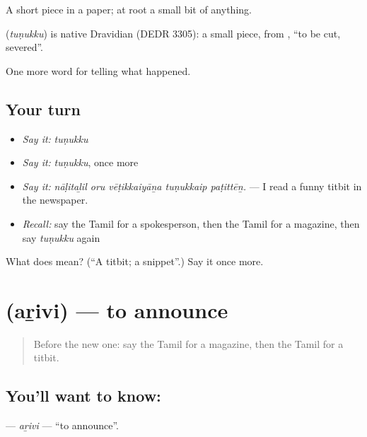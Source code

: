 A short piece in a paper; at root a small bit of anything.

\begin{cousinweb}
\textbf{} (\emph{tuṇukku}) is native Dravidian (DEDR 3305): a small piece, from , \textquotedblleft{}to be cut, severed\textquotedblright{}.
\end{cousinweb}

\begin{grammarlens}[title={What you've built}]
One more word for telling what happened.
\end{grammarlens}

\subsection*{Your turn}
\begin{itemize}
\raggedright
  \item \emph{Say it:} \emph{tuṇukku}
  \item \emph{Say it:} \emph{tuṇukku}, once more
  \item \emph{Say it:} \emph{nāḷitaḻil oru vēṭikkaiyāṉa tuṇukkaip paṭittēṉ.} — I read a funny titbit in the newspaper.
  \item \emph{Recall:} say the Tamil for a spokesperson, then the Tamil for a magazine, then say \emph{tuṇukku} again
\end{itemize}

\begin{tcolorbox}[breakable,colback=teal!4,colframe=teal!35!black,title={Before you move on}]
What does  mean? (\textquotedblleft{}A titbit; a snippet\textquotedblright{}.) Say it once more.
\end{tcolorbox}
\section[\texorpdfstring{\ta{அறிவி} (aṟivi)}{அறிவி (aṟivi)}]{ (aṟivi) — to announce}

\label{lesson:TA-C307-arivi}



\begin{quote}
Before the new one: say the Tamil for a magazine, then the Tamil for a titbit.
\end{quote}

\subsection*{You'll want to know: }
\textbf{} — \emph{aṟivi} — \textquotedblleft{}to announce\textquotedblright{}.


